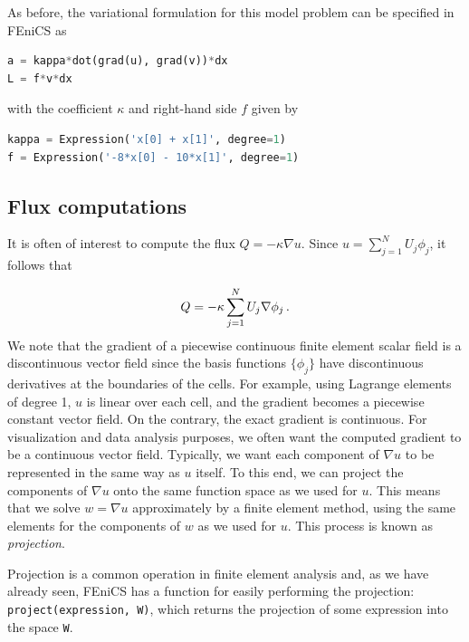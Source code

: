 \documentclass[graybox,envcountchap,sectrefs,final]{svmonodo}
\begin{document}
As before, the variational formulation for this model problem
can be specified in FEniCS as

\begin{lstlisting}[language=Python,style=graycolor]
a = kappa*dot(grad(u), grad(v))*dx
L = f*v*dx
\end{lstlisting}
with the coefficient $\kappa$ and right-hand side $f$ given by

\begin{lstlisting}[language=Python,style=graycolor]
kappa = Expression('x[0] + x[1]', degree=1)
f = Expression('-8*x[0] - 10*x[1]', degree=1)
\end{lstlisting}

\subsection{Flux computations}
\label{ch:poisson0:gradu}

It is often of interest to compute the flux $Q = -\kappa\nabla u$.
Since $u = \sum_{j=1}^N U_j \phi_j$, it follows that

\begin{equation*}
Q = -\kappa\sum_{j=1}^N U_j \nabla \phi_j\thinspace .
\end{equation*}
We note that the gradient of a piecewise continuous finite element scalar
field is a discontinuous vector field since the basis functions
$\{\phi_j\}$ have discontinuous derivatives at the boundaries of the
cells. For example, using Lagrange elements of degree 1, $u$ is linear
over each cell, and the gradient becomes a piecewise
constant vector field. On the contrary, the exact gradient is
continuous. For visualization and data analysis purposes, we often
want the computed gradient to be a continuous vector field. Typically,
we want each component of $\nabla u$ to be represented in the same way
as $u$ itself. To this end, we can project the components of $\nabla
u$ onto the same function space as we used for $u$. This means that
we solve $w = \nabla u$ approximately by a finite element method,
using the same elements for the components of $w$ as we used for
$u$. This process is known as \emph{projection}.


Projection is a common operation in finite element analysis and, as
we have already seen, FEniCS
has a function for easily performing the projection:
\texttt{project(expression, W)}, which returns the projection of some
expression into the space \texttt{W}.
\end{document}
